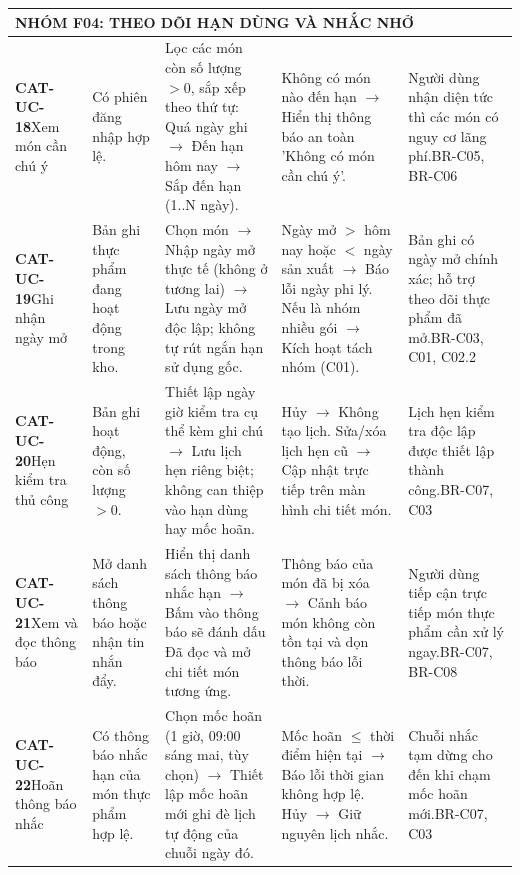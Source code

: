 \documentclass[10pt,a4paper]{article}
\begin{document}
\begin{longtable}{|p{2.1cm}|p{2.3cm}|p{3.5cm}|p{3.8cm}|p{3.0cm}|}
\multicolumn{5}{|l|}{\textbf{\color{primary}NHÓM F04: THEO DÕI HẠN DÙNG VÀ NHẮC NHỞ}} \\
\hline
\textbf{CAT-UC-18}\newline Xem món cần chú ý & Có phiên đăng nhập hợp lệ. & Lọc các món còn số lượng $>0$, sắp xếp theo thứ tự: Quá ngày ghi $\to$ Đến hạn hôm nay $\to$ Sắp đến hạn (1..N ngày). & Không có món nào đến hạn $\to$ Hiển thị thông báo an toàn 'Không có món cần chú ý'. & Người dùng nhận diện tức thì các món có nguy cơ lãng phí.\newline BR-C05, BR-C06 \\
\hline
\textbf{CAT-UC-19}\newline Ghi nhận ngày mở & Bản ghi thực phẩm đang hoạt động trong kho. & Chọn món $\to$ Nhập ngày mở thực tế (không ở tương lai) $\to$ Lưu ngày mở độc lập; không tự rút ngắn hạn sử dụng gốc. & Ngày mở $>$ hôm nay hoặc $<$ ngày sản xuất $\to$ Báo lỗi ngày phi lý. Nếu là nhóm nhiều gói $\to$ Kích hoạt tách nhóm (C01). & Bản ghi có ngày mở chính xác; hỗ trợ theo dõi thực phẩm đã mở.\newline BR-C03, C01, C02.2 \\
\hline
\textbf{CAT-UC-20}\newline Hẹn kiểm tra thủ công & Bản ghi hoạt động, còn số lượng $>0$. & Thiết lập ngày giờ kiểm tra cụ thể kèm ghi chú $\to$ Lưu lịch hẹn riêng biệt; không can thiệp vào hạn dùng hay mốc hoãn. & Hủy $\to$ Không tạo lịch. Sửa/xóa lịch hẹn cũ $\to$ Cập nhật trực tiếp trên màn hình chi tiết món. & Lịch hẹn kiểm tra độc lập được thiết lập thành công.\newline BR-C07, C03 \\
\hline
\textbf{CAT-UC-21}\newline Xem và đọc thông báo & Mở danh sách thông báo hoặc nhận tin nhắn đẩy. & Hiển thị danh sách thông báo nhắc hạn $\to$ Bấm vào thông báo sẽ đánh dấu Đã đọc và mở chi tiết món tương ứng. & Thông báo của món đã bị xóa $\to$ Cảnh báo món không còn tồn tại và dọn thông báo lỗi thời. & Người dùng tiếp cận trực tiếp món thực phẩm cần xử lý ngay.\newline BR-C07, BR-C08 \\
\hline
\textbf{CAT-UC-22}\newline Hoãn thông báo nhắc & Có thông báo nhắc hạn của món thực phẩm hợp lệ. & Chọn mốc hoãn (1 giờ, 09:00 sáng mai, tùy chọn) $\to$ Thiết lập mốc hoãn mới ghi đè lịch tự động của chuỗi ngày đó. & Mốc hoãn $\le$ thời điểm hiện tại $\to$ Báo lỗi thời gian không hợp lệ. Hủy $\to$ Giữ nguyên lịch nhắc. & Chuỗi nhắc tạm dừng cho đến khi chạm mốc hoãn mới.\newline BR-C07, C03 \\

\end{longtable}
\end{document}

